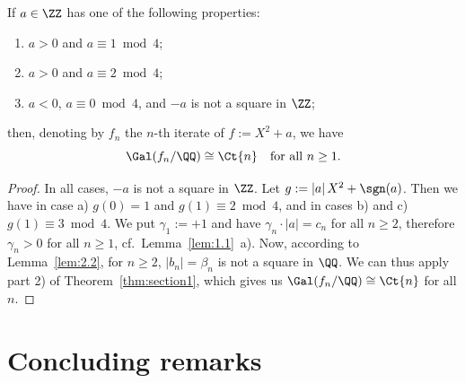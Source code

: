 \begin{theorem}[Section 3]
  \label{thm:section3}
  \leanok
  If $a \in \ZZ$ has one of the following properties:
  \begin{enumerate}
    \item[a)] $a > 0$ and $a \equiv 1 \bmod 4$;
    \item[b)] $a > 0$ and $a \equiv 2 \bmod 4$;
    \item[c)] $a < 0$, $a \equiv 0 \bmod 4$, and $-a$ is not a square in $\ZZ$;
  \end{enumerate}
  then, denoting by $f_n$ the $n$-th iterate of $f := X^2 + a$, we have
  \[ \Gal(f_n/\QQ) \cong \Ct{n} \quad\text{for all } n \ge 1. \]
\end{theorem}
\begin{proof}
  \leanok
  In all cases, $-a$ is not a square in $\ZZ$. Let $g := |a|\,X^2 + \sgn(a)$. Then we have in
  case a) $g(0) = 1$ and $g(1) \equiv 2 \bmod 4$, and in cases b) and c) $g(1) \equiv 3 \bmod 4$.
  We put $\gamma_1 := +1$ and have $\gamma_n \cdot |a| = c_n$ for all $n \ge 2$, therefore
  $\gamma_n > 0$ for all $n \ge 1$, cf.\ Lemma~\ref{lem:1.1}~a). Now, according to
  Lemma~\ref{lem:2.2}, for $n \ge 2$, $|b_n| = \beta_n$ is not a square in $\QQ$. We can thus
  apply part 2) of Theorem~\ref{thm:section1}, which gives us $\Gal(f_n/\QQ) \cong \Ct{n}$ for
  all $n$.
\end{proof}

\section*{Concluding remarks}

